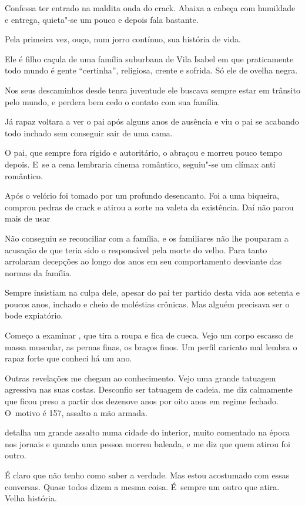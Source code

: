 Confessa ter entrado na maldita onda do crack. Abaixa a cabeça com
humildade e entrega, quieta"-se um pouco e depois fala bastante.

Pela primeira vez, ouço, num jorro contínuo, sua história de vida.

Ele é filho caçula de uma família suburbana de Vila Isabel em que
praticamente todo mundo é gente ``certinha'', religiosa, crente e
sofrida. Só ele de ovelha negra.

Nos seus descaminhos desde tenra juventude ele buscava sempre estar em
trânsito pelo mundo, e perdera bem cedo o contato com sua família.

Já rapaz voltara a ver o pai após alguns anos de ausência e viu o pai se
acabando todo inchado sem conseguir sair de uma cama.

O pai, que sempre fora rígido e autoritário, o abraçou e morreu pouco
tempo depois. E~se a cena lembraria cinema romântico, seguiu"-se um
clímax anti romântico.

Após o velório  foi tomado por um profundo desencanto. Foi a uma
biqueira, comprou pedras de crack e atirou a sorte na valeta da
existência. Daí não parou mais de usar

Não conseguiu se reconciliar com a família, e os familiares não lhe
pouparam a acusação de que teria sido o responsável pela morte do velho.
Para tanto arrolaram decepções ao longo dos anos em seu comportamento
desviante das normas da família.

Sempre insistiam na culpa dele, apesar do pai ter partido desta vida aos
setenta e poucos anos, inchado e cheio de moléstias crônicas. Mas alguém
precisava ser o bode expiatório.

\asterisc{}

Começo a examinar , que tira a roupa e fica de cueca. Vejo um corpo
escasso de massa muscular, as pernas finas, os braços finos. Um perfil
caricato mal lembra o rapaz forte que conheci há um ano.

Outras revelações me chegam ao conhecimento. Vejo uma grande tatuagem
agressiva nas suas costas. Desconfio ser tatuagem de cadeia.  me diz
calmamente que ficou preso a partir dos dezenove anos por oito anos em
regime fechado. O~motivo é 157, assalto a mão armada.

 detalha um grande assalto numa cidade do interior, muito comentado na
época nos jornais e quando uma pessoa morreu baleada, e me diz que quem
atirou foi outro.

É claro que não tenho como saber a verdade. Mas estou acostumado com
essas conversas. Quase todos dizem a mesma coisa. É~sempre um outro que
atira. Velha história.

